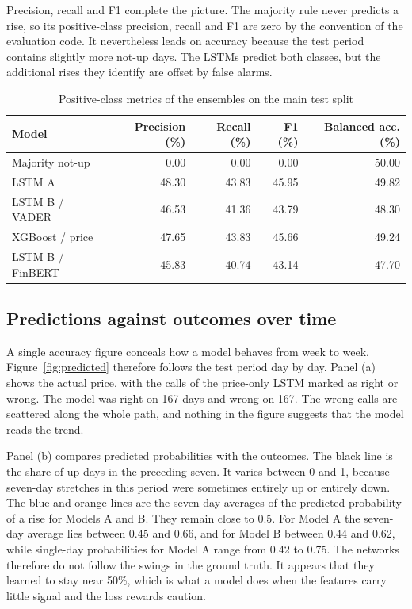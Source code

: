 
Precision, recall and F1 complete the picture. The majority rule never predicts a rise, so its positive-class precision, recall and F1 are zero by the convention of the evaluation code. It nevertheless leads on accuracy because the test period contains slightly more not-up days. The LSTMs predict both classes, but the additional rises they identify are offset by false alarms.

\begin{table}[htbp]\centering\small
\caption{Positive-class metrics of the ensembles on the main test split}\label{tab:prf}
\begin{tabularx}{\textwidth}{Xrrrr}
\toprule
Model & Precision (\%) & Recall (\%) & F1 (\%) & Balanced acc. (\%)\\\midrule
Majority not-up & 0.00 & 0.00 & 0.00 & 50.00\\
LSTM A & 48.30 & 43.83 & 45.95 & 49.82\\
LSTM B / VADER & 46.53 & 41.36 & 43.79 & 48.30\\
XGBoost / price & 47.65 & 43.83 & 45.66 & 49.24\\
LSTM B / FinBERT & 45.83 & 40.74 & 43.14 & 47.70\\
\bottomrule
\end{tabularx}
\end{table}

\subsection{Predictions against outcomes over time}
A single accuracy figure conceals how a model behaves from week to week. Figure~\ref{fig:predicted} therefore follows the test period day by day. Panel (a) shows the actual price, with the calls of the price-only LSTM marked as right or wrong. The model was right on 167 days and wrong on 167. The wrong calls are scattered along the whole path, and nothing in the figure suggests that the model reads the trend.

Panel (b) compares predicted probabilities with the outcomes. The black line is the share of up days in the preceding seven. It varies between 0 and 1, because seven-day stretches in this period were sometimes entirely up or entirely down. The blue and orange lines are the seven-day averages of the predicted probability of a rise for Models A and B. They remain close to 0.5. For Model A the seven-day average lies between 0.45 and 0.66, and for Model B between 0.44 and 0.62, while single-day probabilities for Model A range from 0.42 to 0.75. The networks therefore do not follow the swings in the ground truth. It appears that they learned to stay near 50\%, which is what a model does when the features carry little signal and the loss rewards caution.

